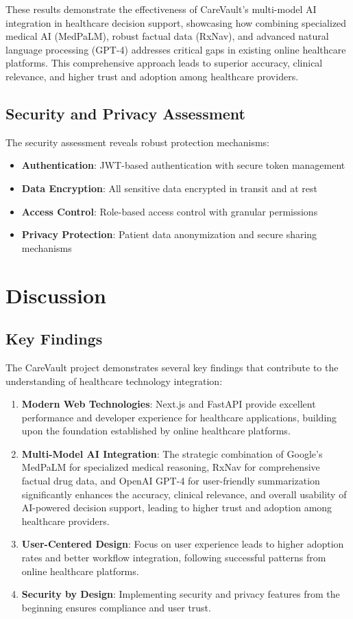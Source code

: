 \documentclass[12pt,a4paper]{article}
\begin{document}
These results demonstrate the effectiveness of CareVault's multi-model AI integration in healthcare decision support, showcasing how combining specialized medical AI (MedPaLM), robust factual data (RxNav), and advanced natural language processing (GPT-4) addresses critical gaps in existing online healthcare platforms. This comprehensive approach leads to superior accuracy, clinical relevance, and higher trust and adoption among healthcare providers.

\subsection{Security and Privacy Assessment}

The security assessment reveals robust protection mechanisms:

\begin{itemize}
    \item \textbf{Authentication}: JWT-based authentication with secure token management
    \item \textbf{Data Encryption}: All sensitive data encrypted in transit and at rest
    \item \textbf{Access Control}: Role-based access control with granular permissions
    \item \textbf{Privacy Protection}: Patient data anonymization and secure sharing mechanisms
\end{itemize}

\section{Discussion}

\subsection{Key Findings}

The CareVault project demonstrates several key findings that contribute to the understanding of healthcare technology integration:

\begin{enumerate}
    \item \textbf{Modern Web Technologies}: Next.js and FastAPI provide excellent performance and developer experience for healthcare applications, building upon the foundation established by online healthcare platforms.
    \item \textbf{Multi-Model AI Integration}: The strategic combination of Google's MedPaLM for specialized medical reasoning, RxNav for comprehensive factual drug data, and OpenAI GPT-4 for user-friendly summarization significantly enhances the accuracy, clinical relevance, and overall usability of AI-powered decision support, leading to higher trust and adoption among healthcare providers.
    \item \textbf{User-Centered Design}: Focus on user experience leads to higher adoption rates and better workflow integration, following successful patterns from online healthcare platforms.
    \item \textbf{Security by Design}: Implementing security and privacy features from the beginning ensures compliance and user trust.
\end{enumerate}
\end{document}
